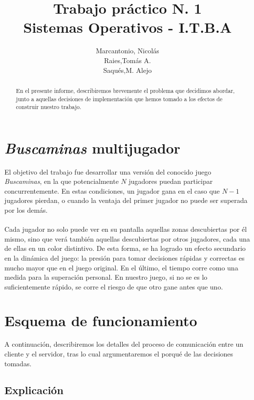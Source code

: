 \documentclass[spanish]{article}
\title{Trabajo práctico N. 1\\Sistemas Operativos - I.T.B.A}
\author{Marcantonio, Nicolás\\Raies,Tomás A.\\Saqués,M. Alejo}
\date{}
\begin{document}
\maketitle
\begin{abstract}
	En el presente informe, describiremos brevemente el problema que decidimos abordar, junto a aquellas decisiones de implementación que hemos tomado a los efectos de construir nuestro trabajo.
\end{abstract}
\newpage
\section{\textit{Buscaminas} multijugador }
\paragraph{} El objetivo del trabajo fue desarrollar una versión del conocido juego \textit{Buscaminas}, en la que potencialmente $N$ jugadores puedan participar concurrentemente. En estas condiciones, un jugador gana en el caso que $N-1$ jugadores pierdan, o cuando la ventaja del primer jugador no puede ser superada por los demás.
\paragraph{} Cada jugador no solo puede ver en su pantalla aquellas zonas descubiertas por él mismo, sino que verá también aquellas descubiertas por otros jugadores, cada una de ellas en un color distintivo. De esta forma, se ha logrado un efecto secundario en la dinámica del juego: la presión para tomar decisiones rápidas y correctas es mucho mayor que en el juego original. En el último, el tiempo corre como una medida para la superación personal. En nuestro juego, si no se es lo suficientemente rápido, se corre el riesgo de que otro gane antes que uno. 
\section{Esquema de funcionamiento}
\paragraph{} A continuación, describiremos los detalles del proceso de comunicación entre un cliente y el servidor, tras lo cual argumentaremos el porqué de las decisiones tomadas. 
\subsection{Explicación}
\end{document}

